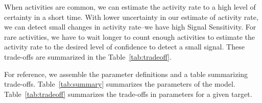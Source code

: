 \documentclass{article}
\begin{document}
When 
\reversemarginpar\marginpar{\raggedleft
%
    \begin{tikzpicture}[scale=0.26]]
\draw [red, very thick, rotate around={0: (0, 0)}] (-0.7, -0.7) rectangle(3.7, 3.298076211353316);
%
\draw [very thick, <->] (0.25000000000000006, 0.4330127018922193) -- (1.25, 2.165063509461097) ;
\draw [very thick, <->] (1.75, 2.165063509461097) -- (2.75, 0.4330127018922193) ;
\draw [very thick, <->] (2.5, 0) -- (0.5, 0) ;
%
\draw [orange, ultra thick] (0,0) circle [radius= 0.5 ];
\draw [yellow, ultra thick] ( 1.5 , 2.59807621135 ) circle [radius= 0.5 ];
\draw [green,  ultra thick] ( 3.0 , 0 ) circle [radius= 0.5 ];
    \end{tikzpicture}
%
%
}
activities are common, we can estimate the activity rate to a high level of certainty in a short time. With lower
uncertainty in our estimate of activity rate, we can detect small changes in activity rate--we have high Signal
Sensitivity. For rare activities, we have to wait longer to count enough activities to estimate the activity rate to
the desired level of confidence to detect a small signal. These trade-offs are summarized in the Table~\ref{tab:tradeoff}.

For reference, we assemble the parameter definitions and a table summarizing trade-offs.  Table~\ref{tab:summary}
summarizes the parameters of the model. Table~\ref{tab:tradeoff} summarizes the trade-offs in parameters for
a given target.
\end{document}
